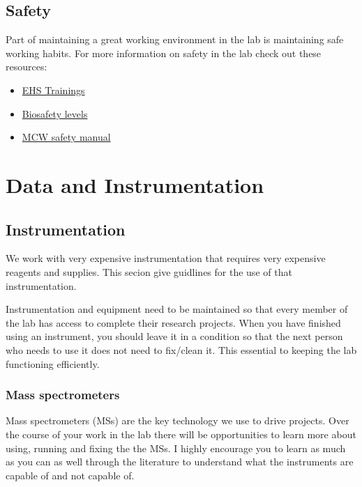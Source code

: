 \documentclass[
]{book}
\providecommand{\tightlist}{%
  \setlength{\itemsep}{0pt}\setlength{\parskip}{0pt}}
\begin{document}
\hypertarget{safety}{%
\section{Safety}\label{safety}}

Part of maintaining a great working environment in the lab is maintaining safe working habits. For more information on safety in the lab check out these resources:

\begin{itemize}
\tightlist
\item
  \href{https://www.mcw.edu/departments/research-systems/training/safety}{EHS Trainings}
\item
  \href{https://www.mcw.edu/departments/institutional-biosafety-committee-ibc/biosafety-levels}{Biosafety levels}
\item
  \href{https://infoscope.mcw.edu/FileLibrary/Groups/InfoScopeSafety/Manuals/SafetyManual_2017.pdf}{MCW safety manual}
\end{itemize}

\hypertarget{data}{%
\chapter{Data and Instrumentation}\label{data}}

\hypertarget{instrumentation}{%
\section{Instrumentation}\label{instrumentation}}

We work with very expensive instrumentation that requires very expensive reagents and supplies. This secion give guidlines for the use of that instrumentation.

Instrumentation and equipment need to be maintained so that every member of the lab has access to complete their research projects. When you have finished using an instrument, you should leave it in a condition so that the next person who needs to use it does not need to fix/clean it. This essential to keeping the lab functioning efficiently.

\hypertarget{mass-spectrometers}{%
\subsection{Mass spectrometers}\label{mass-spectrometers}}

Mass spectrometers (MSs) are the key technology we use to drive projects. Over the course of your work in the lab there will be opportunities to learn more about using, running and fixing the the MSs. I highly encourage you to learn as much as you can as well through the literature to understand what the instruments are capable of and not capable of.
\end{document}
